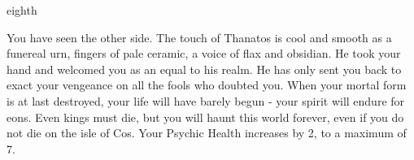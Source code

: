 \documentclass[greennotebook]{Kos}
\begin{document}
\begin{page}{eighth}

You have seen the other side. The touch of Thanatos is cool and smooth as a funereal urn, fingers of pale ceramic, a voice of flax and obsidian. He took your hand and welcomed you as an equal to his realm. He has only sent you back to exact your vengeance on all the fools who doubted you. When your mortal form is at last destroyed, your life will have barely begun - your spirit will endure for eons. Even kings must die, but you will haunt this world forever, even if you do not die on the isle of Cos. Your Psychic Health increases by 2, to a maximum of 7.

\end{page}

\endnotebook
\end{document}
